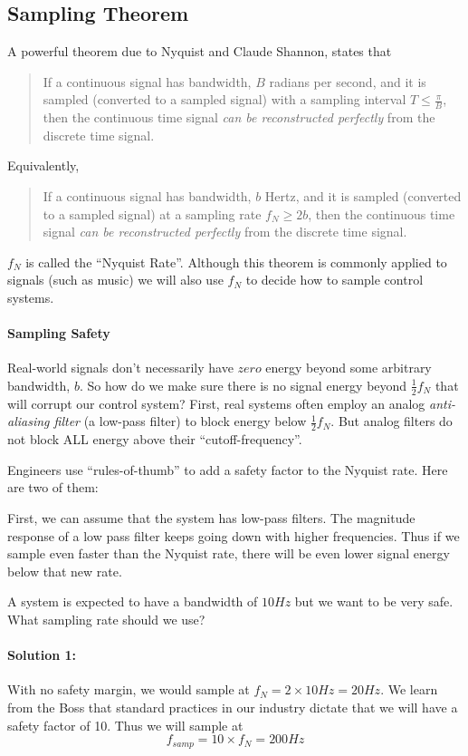 \subsection{Sampling Theorem}

A powerful theorem due to Nyquist and Claude Shannon, states that

\begin{quotation}
  If a continuous signal has bandwidth, $B$ radians per second, and it is sampled (converted to a sampled signal) with
a sampling interval
$T \leq  \frac{\pi}{B}$, then the continuous time signal {\it can be reconstructed perfectly} from the discrete time signal.
\end{quotation}

Equivalently,

\begin{quotation}
  If a continuous signal has bandwidth, $b$ Hertz, and it is sampled (converted to a sampled signal) at a sampling rate
$f_N \geq  2b$, then the continuous time signal {\it can be reconstructed perfectly} from the discrete time signal.
\end{quotation}

$f_N$ is called the ``Nyquist Rate''.   Although this theorem is commonly applied to signals (such as music)
we will also use $f_N$ to decide how to sample control systems.

\paragraph{Sampling Safety}
Real-world signals don't necessarily have $zero$ energy beyond some arbitrary bandwidth, $b$.   So how do we make sure there is no signal
energy beyond $\frac{1}{2}f_N$  that will corrupt our control system?    First, real systems often employ an analog {\it anti-aliasing filter}
(a low-pass filter) to block energy below $\frac{1}{2}f_N$.  But analog filters do not
block ALL energy above their ``cutoff-frequency''.

Engineers use ``rules-of-thumb'' to add a safety factor to the Nyquist rate.   Here are two of them:

First, we can assume that the system has low-pass filters.  The magnitude response of a low pass filter keeps going down with higher frequencies.
Thus if we sample even faster than the Nyquist rate, there will be even lower signal energy below that new rate.

\begin{ExampleSmall}
A system is expected to have a bandwidth of $10Hz$ but we want to be very safe.   What sampling rate should we use?

\paragraph{Solution 1:}   With no safety margin, we would sample at $f_N  = 2\times10Hz = 20Hz$.   We learn from the Boss that standard practices
in our industry dictate that we will have a safety factor of 10.   Thus we will sample at
\[
f_{samp} = 10\times f_N = 200Hz
\]
\end{ExampleSmall}

